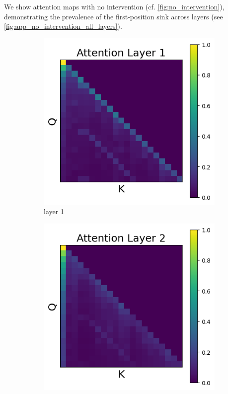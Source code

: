 \documentclass[11pt]{article}
\begin{document}
We show attention maps with no intervention (cf. \cref{fig:no_intervention}), demonstrating the prevalence of the first-position sink across layers (see \cref{fig:app_no_intervention_all_layers}).
\begin{figure}[t]
  \begin{subfigure}[t]{0.24\textwidth}
    \centering
    \includegraphics[width=1.4\columnwidth]{figures/no_intervention/layer_1.png}
    \caption{layer 1}
  \end{subfigure}\hfill
  \begin{subfigure}[t]{0.24\textwidth}
    \centering
    \includegraphics[width=1.4\columnwidth]{figures/no_intervention/layer_2.png}

\end{subfigure}
\end{figure}
\end{document}

